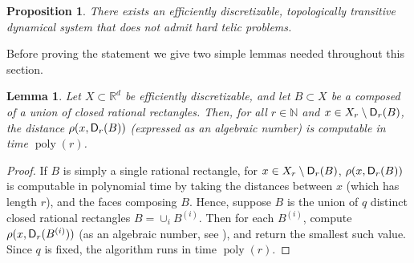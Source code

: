 \documentclass{amsart}
\theoremstyle{theorem}
\newtheorem{lemma}[theorem]{Lemma}
\newtheorem{proposition}[theorem]{Proposition}
\theoremstyle{remark}
\numberwithin{equation}{section}
\DeclareMathOperator{\poly}{poly}
\newcommand{\NN}{\mathbb{N}}
\newcommand{\RR}{\mathbb{R}}
\newcommand{\ccD}{\textsf{\upshape D}}
\begin{document}
\begin{proposition}\label{propTransitivity}
There exists an efficiently discretizable, topologically transitive dynamical system that does not admit hard telic problems.
\end{proposition}

Before proving the statement we give two simple lemmas needed throughout this section.

\begin{lemma}\label{lemEfficientDistCheck}
Let $X \subset \RR^d$ be efficiently discretizable, and let $B \subset X$ be a composed of a union of closed rational rectangles. Then, for all $r \in \NN$ and $x \in X_r\setminus \ccD_r(B)$, the distance $\rho(x, \ccD_r(B))$ (expressed as an algebraic number) is computable in time $\poly(r)$.
\end{lemma}
\begin{proof}
If $B$ is simply a single rational rectangle, for $x \in X_r\setminus \ccD_r(B)$, $\rho(x, \ccD_r(B))$ is computable in polynomial time by taking the distances between $x$ (which has length $r$), and the faces composing $B$. Hence, suppose $B$ is the union of $q$ distinct closed rational rectangles $B = \cup_i B^{(i)}$. Then for each $B^{(i)}$, compute $\rho(x, \ccD_r(B^{(i)}))$ (as an algebraic number, see \cite{basu2006algorithms}), and return the smallest such value. Since $q$ is fixed, the algorithm runs in time $\poly(r)$.
\end{proof}
\end{document}
